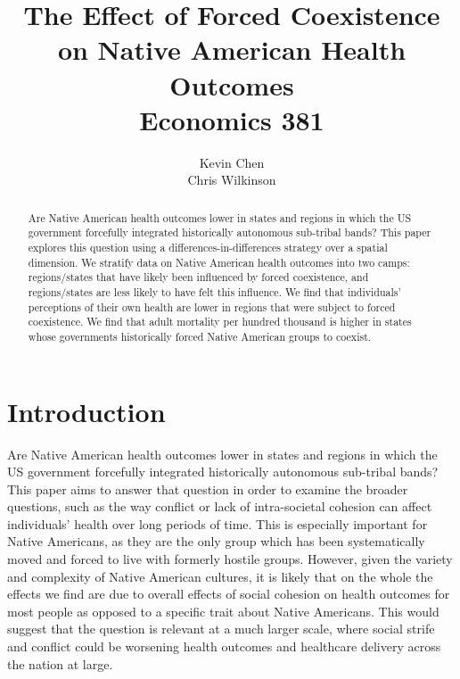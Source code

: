 \documentclass[12pt]{article}
\title{
The Effect of Forced Coexistence \\ on Native American Health Outcomes \\ 
{\small \sc Economics 381}
}
\author{Kevin Chen \\ Chris Wilkinson}
\begin{document}

\maketitle

\begin{abstract}
Are Native American health outcomes lower in states and regions in which the US government forcefully integrated historically autonomous sub-tribal bands? This paper explores this question using a differences-in-differences strategy over a spatial dimension. We stratify data on Native American health outcomes into two camps: regions/states that have likely been influenced by forced coexistence, and regions/states are less likely to have felt this influence. We find that individuals' perceptions of their own health are lower in regions that were subject to forced coexistence. We find that adult mortality per hundred thousand is higher in states whose governments historically forced Native American groups to coexist.
\end{abstract}

\newpage


\doublespacing

\section{Introduction}
Are Native American health outcomes lower in states and regions in which the US government forcefully integrated historically autonomous sub-tribal bands? 
This paper aims to answer that question in order to examine the broader questions, such as the way conflict or lack of intra-societal cohesion can affect individuals’ health over long periods of time.
This is especially important for Native Americans, as they are the only group which has been systematically moved and forced to live with formerly hostile groups.
However, given the variety and complexity of Native American cultures, it is likely that on the whole the effects we find are due to overall effects of social cohesion on health outcomes for most people as opposed to a specific trait about Native Americans.
This would suggest that the question is relevant at a much larger scale, where social strife and conflict could be worsening health outcomes and healthcare delivery across the nation at large.
\end{document}
